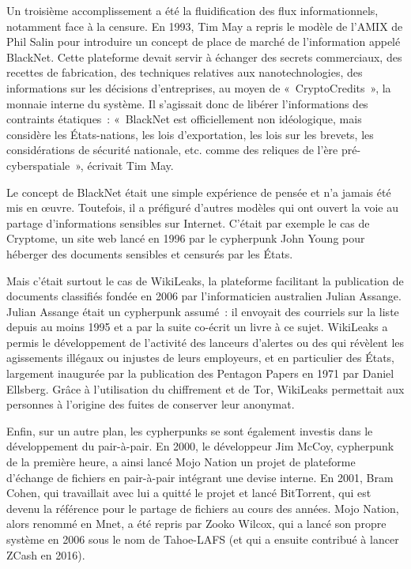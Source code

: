 Un troisième accomplissement a été la fluidification des flux informationnels, notamment face à la censure. En 1993, Tim May a repris le modèle de l'AMIX de Phil Salin pour introduire un concept de place de marché de l'information appelé BlackNet. Cette plateforme devait servir à échanger des secrets commerciaux, des recettes de fabrication, des techniques relatives aux nanotechnologies, des informations sur les décisions d'entreprises, au moyen de «~CryptoCredits~», la monnaie interne du système. Il s'agissait donc de libérer l'informations des contraints étatiques~: «~BlackNet est officiellement non idéologique, mais considère les États-nations, les lois d'exportation, les lois sur les brevets, les considérations de sécurité nationale, etc. comme des reliques de l'ère pré-cyberspatiale~», écrivait Tim May.

Le concept de BlackNet était une simple expérience de pensée et n'a jamais été mis en œuvre. Toutefois, il a préfiguré d'autres modèles qui ont ouvert la voie au partage d'informations sensibles sur Internet. C'était par exemple le cas de Cryptome, un site web lancé en 1996 par le cypherpunk John Young pour héberger des documents sensibles et censurés par les États.

Mais c'était surtout le cas de WikiLeaks, la plateforme facilitant la publication de documents classifiés fondée en 2006 par l'informaticien australien Julian Assange. Julian Assange était un cypherpunk assumé~: il envoyait des courriels sur la liste depuis au moins 1995 et a par la suite co-écrit un livre à ce sujet. WikiLeaks a permis le développement de l'activité des lanceurs d'alertes ou des  qui révèlent les agissements illégaux ou injustes de leurs employeurs, et en particulier des États, largement inaugurée par la publication des Pentagon Papers en 1971 par Daniel Ellsberg. Grâce à l'utilisation du chiffrement et de Tor, WikiLeaks permettait aux personnes à l'origine des fuites de conserver leur anonymat.

Enfin, sur un autre plan, les cypherpunks se sont également investis dans le développement du pair-à-pair. En 2000, le développeur Jim McCoy, cypherpunk de la première heure, a ainsi lancé Mojo Nation un projet de plateforme d'échange de fichiers en pair-à-pair intégrant une devise interne. En 2001, Bram Cohen, qui travaillait avec lui a quitté le projet et lancé BitTorrent, qui est devenu la référence pour le partage de fichiers au cours des années. Mojo Nation, alors renommé en Mnet, a été repris par Zooko Wilcox, qui a lancé son propre système en 2006 sous le nom de Tahoe-LAFS (et qui a ensuite contribué à lancer ZCash en 2016). %

